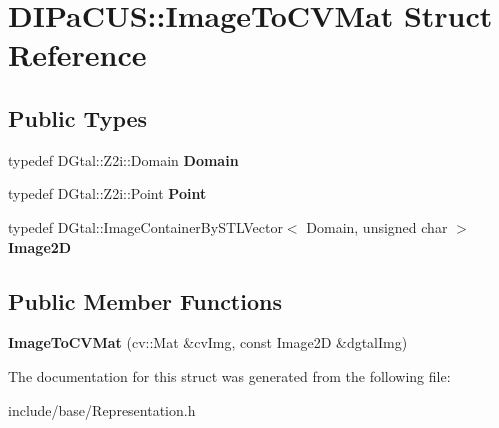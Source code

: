 \hypertarget{structDIPaCUS_1_1ImageToCVMat}{}\section{D\+I\+Pa\+C\+US\+:\+:Image\+To\+C\+V\+Mat Struct Reference}
\label{structDIPaCUS_1_1ImageToCVMat}
\subsection*{Public Types}
\begin{DoxyCompactItemize}
\item 
\mbox{\label{structDIPaCUS_1_1ImageToCVMat_afbf80bff5a68ac5fbc49df1f1fc6eed3}} 
typedef D\+Gtal\+::\+Z2i\+::\+Domain {\bfseries Domain}
\item 
\mbox{\label{structDIPaCUS_1_1ImageToCVMat_abfe08748c9891d9121c970c9903ee2f8}} 
typedef D\+Gtal\+::\+Z2i\+::\+Point {\bfseries Point}
\item 
\mbox{\label{structDIPaCUS_1_1ImageToCVMat_ac98939ce2ab677f8c51a4c7ed7a70ac4}} 
typedef D\+Gtal\+::\+Image\+Container\+By\+S\+T\+L\+Vector$<$ Domain, unsigned char $>$ {\bfseries Image2D}
\end{DoxyCompactItemize}
\subsection*{Public Member Functions}
\begin{DoxyCompactItemize}
\item 
\mbox{\label{structDIPaCUS_1_1ImageToCVMat_ab0b30eff526a31c791c5af1850bc61ce}} 
{\bfseries Image\+To\+C\+V\+Mat} (cv\+::\+Mat \&cv\+Img, const Image2D \&dgtal\+Img)
\end{DoxyCompactItemize}


The documentation for this struct was generated from the following file\+:\begin{DoxyCompactItemize}
\item 
include/base/Representation.\+h\end{DoxyCompactItemize}
